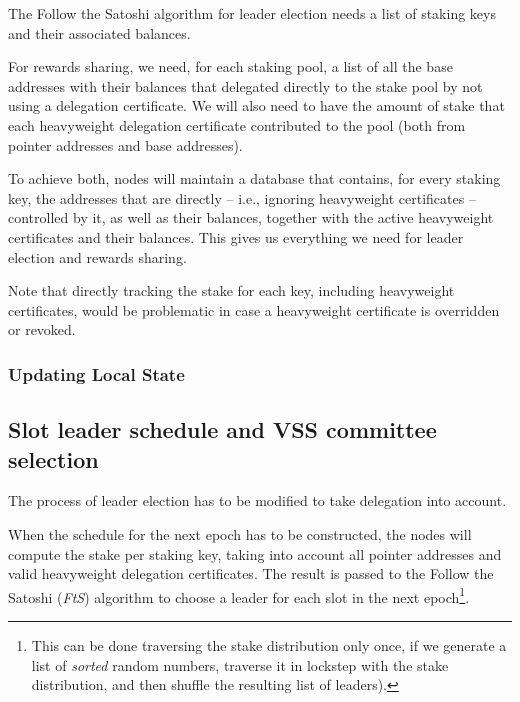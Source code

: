 \documentclass[11pt,a4paper]{article}
\begin{document}
The Follow the Satoshi algorithm for leader election needs a list of
staking keys and their associated balances.

For rewards sharing, we need, for each staking pool, a list of all the
base addresses with their balances that delegated directly to the stake
pool by not using a delegation certificate. We will also need to have
the amount of stake that each heavyweight delegation certificate
contributed to the pool (both from pointer addresses and base
addresses).

To achieve both, nodes will maintain a database that contains, for every
staking key, the addresses that are directly -- i.e., ignoring
heavyweight certificates -- controlled by it, as well as their balances,
together with the active heavyweight certificates and their balances.
This gives us everything we need for leader election and rewards
sharing.

Note that directly tracking the stake for each key, including
heavyweight certificates, would be problematic in case a heavyweight
certificate is overridden or revoked.

\subsubsection{Updating Local State}\label{updating-local-state}


\subsection{Slot leader schedule and VSS committee
selection}\label{slot-leader-schedule-and-vss-committee-selection}

The process of leader election has to be modified to take delegation
into account.

When the schedule for the next epoch has to be constructed, the nodes
will compute the stake per staking key, taking into account all pointer
addresses and valid heavyweight delegation certificates. The result is
passed to the Follow the Satoshi (\emph{FtS}) algorithm to choose a
leader for each slot in the next epoch\footnote{This can be done
  traversing the stake distribution only once, if we generate a list of
  \emph{sorted} random numbers, traverse it in lockstep with the stake
  distribution, and then shuffle the resulting list of leaders).}.
\end{document}

